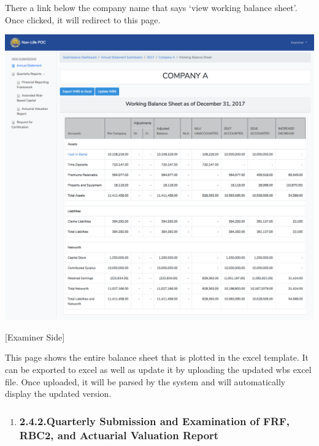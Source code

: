 \documentclass{article}
\begin{document}
There a link below the company name that says ‘view
working balance sheet’. Once clicked, it will redirect to this
page.%

\includegraphics[keepaspectratio=true]{up-ic-screens/image68}{}%

[Examiner Side]%

This page shows the entire balance sheet that is
plotted in the excel template. It can be exported to excel as well as
update it by uploading the updated wbs excel file. Once uploaded, it
will be parsed by the system and will automatically display the updated
version.%

\begin{enumerate}[noitemsep,topsep=\mdcompacttopsep]%

\item{}
\subsubsection{2.4.2.\hspace*{0.5em}Quarterly Submission and Examination of FRF, RBC2, and Actuarial Valuation Report}\label{sec-quarterly-submission-and-examination-of-frf-rbc2-and-actuarial-valuation-report}%
\end{enumerate}%
\end{document}
